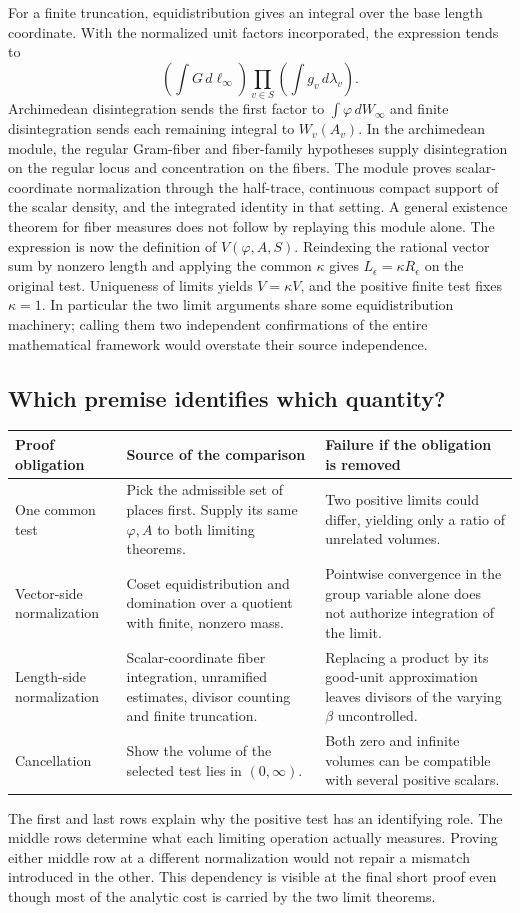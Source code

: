 \documentclass[12pt,letterpaper]{article}
\begin{document}
For a finite truncation, equidistribution gives an integral over the base length coordinate. With the normalized unit factors incorporated, the expression tends to
\[
 \left(\int G\,d\ell_\infty\right)
      \prod_{v\in S}\left(\int g_v\,d\lambda_v\right).
\]
Archimedean disintegration sends the first factor to $\int\varphi\,dW_\infty$ and finite disintegration sends each remaining integral to $W_v(A_v)$. In the archimedean module, the regular Gram-fiber and fiber-family hypotheses supply disintegration on the regular locus and concentration on the fibers. The module proves scalar-coordinate normalization through the half-trace, continuous compact support of the scalar density, and the integrated identity in that setting. A general existence theorem for fiber measures does not follow by replaying this module alone. The expression is now the definition of $V(\varphi,A,S)$. Reindexing the rational vector sum by nonzero length and applying the common $\kappa$ gives $L_\epsilon=\kappa R_\epsilon$ on the original test. Uniqueness of limits yields $V=\kappa V$, and the positive finite test fixes $\kappa=1$. In particular the two limit arguments share some equidistribution machinery; calling them two independent confirmations of the entire mathematical framework would overstate their source independence.

\subsection{Which premise identifies which quantity?}
\begin{center}\small\begin{tabularx}{\linewidth}{p{.23\linewidth}YY}\toprule
Proof obligation & Source of the comparison & Failure if the obligation is removed\\\midrule
One common test & Pick the admissible set of places first. Supply its same $\varphi,A$ to both limiting theorems. & Two positive limits could differ, yielding only a ratio of unrelated volumes.\\
Vector-side normalization & Coset equidistribution and domination over a quotient with finite, nonzero mass. & Pointwise convergence in the group variable alone does not authorize integration of the limit.\\
Length-side normalization & Scalar-coordinate fiber integration, unramified estimates, divisor counting and finite truncation. & Replacing a product by its good-unit approximation leaves divisors of the varying $\beta$ uncontrolled.\\
Cancellation & Show the volume of the selected test lies in $(0,\infty)$. & Both zero and infinite volumes can be compatible with several positive scalars.\\\bottomrule\end{tabularx}\end{center}
The first and last rows explain why the positive test has an identifying role. The middle rows determine what each limiting operation actually measures. Proving either middle row at a different normalization would not repair a mismatch introduced in the other. This dependency is visible at the final short proof even though most of the analytic cost is carried by the two limit theorems.
\end{document}
